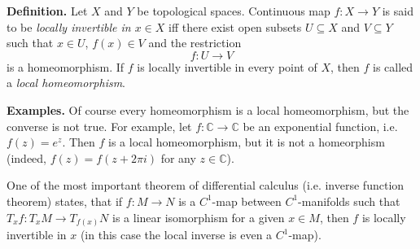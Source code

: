 \documentclass[12pt]{article}
\begin{document}
\textbf{Definition.} Let $X$ and $Y$ be topological spaces. Continuous map $f:X\to Y$ is said to be \textit{locally invertible in $x\in X$} iff there exist open subsets $U\subseteq X$ and $V\subseteq Y$ such that $x\in U$, $f(x)\in V$ and the restriction $$f:U\to V$$ is a homeomorphism. If $f$ is locally invertible in every point of $X$, then $f$ is called a \textit{local homeomorphism}.

\textbf{Examples.} Of course every homeomorphism is a local homeomorphism, but the converse is not true. For example, let $f:\mathbb{C}\to\mathbb{C}$ be an exponential function, i.e. $f(z)=e^z$. Then $f$ is a local homeomorphism, but it is not a homeorphism (indeed, $f(z)=f(z+2\pi i)$ for any $z\in\mathbb{C}$).

One of the most important theorem of differential calculus (i.e. inverse function theorem) states, that if $f:M\to N$ is a $C^1$-map between $C^1$-manifolds such that $T_{x}f:T_{x}M\to T_{f(x)}N$ is a linear isomorphism for a given $x\in M$, then $f$ is locally invertible in $x$ (in this case the local inverse is even a $C^1$-map).
\end{document}
